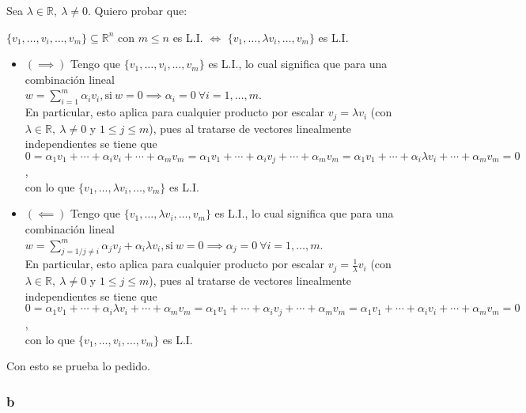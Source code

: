 \documentclass{article}
\begin{document}
Sea $\lambda \in \mathbb{R},~ \lambda \neq 0$. Quiero probar que:

\begin{center}
    $\{v_1,\ldots,v_i,\ldots,v_m\} \subseteq \mathbb{R}^{n}$ con $m \leq n$ es L.I. 
    $\iff$ 
    $\{v_1,\ldots,\lambda v_i,\ldots,v_m\}$ es L.I.
\end{center}

\begin{itemize}
    \item[] $(\implies)$ Tengo que $\{v_1,\ldots,v_i,\ldots,v_m\}$ es L.I., lo cual significa que para una combinación 
    lineal \\ $w = \sum_{i=1}^{m} \alpha_{i}v_{i}, \text{si} ~w = 0 \implies \alpha_i = 0 ~ \forall i = 1,\ldots,m$. \\ En
    particular, esto aplica para cualquier producto por escalar $v_j = \lambda v_i$ (con $\lambda \in \mathbb{R}, ~ \lambda \neq 0$ y $1 \leq j \leq m$),
    pues al tratarse de vectores linealmente independientes se tiene que \\
    $0 = \alpha_1v_1+\cdots+\alpha_{i}v_{i}+\cdots+\alpha_{m}v_{m} = 
    \alpha_1v_1+\cdots+\alpha_{i}v_{j}+\cdots+\alpha_{m}v_{m} = 
    \alpha_1v_1+\cdots+\alpha_{i}\lambda v_{i}+\cdots+\alpha_{m}v_{m} = 0$, \\
    con lo que $\{v_1,\ldots,\lambda v_i,\ldots,v_m\}$ es L.I.
    \item[] $(\impliedby)$ Tengo que $\{v_1,\ldots,\lambda v_i,\ldots,v_m\}$ es L.I., lo cual significa que para una combinación 
    lineal \\ $w = \sum_{j=1 / j \neq i}^{m} \alpha_{j}v_{j} + \alpha_i\lambda v_i, \text{si} ~w = 0 \implies \alpha_j = 0 ~ \forall i = 1,\ldots,m$. \\
    En particular, esto aplica para cualquier producto por escalar $v_j = \frac{1}{\lambda}v_i$ (con $\lambda \in \mathbb{R}, ~\lambda \neq 0$ y $1 \leq j \leq m$),
    pues al tratarse de vectores linealmente independientes se tiene que \\
    $0 = \alpha_1v_1+\cdots+\alpha_{i}\lambda v_{i}+\cdots+\alpha_{m}v_{m} = 
    \alpha_1v_1+\cdots+\alpha_{i}v_{j}+\cdots+\alpha_{m}v_{m} = 
    \alpha_1v_1+\cdots+\alpha_{i}v_{i}+\cdots+\alpha_{m}v_{m} = 0$, \\
    con lo que $\{v_1,\ldots,v_i,\ldots,v_m\}$ es L.I.
\end{itemize}

\noindent Con esto se prueba lo pedido.

\subsubsection*{b}
\end{document}
